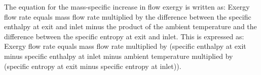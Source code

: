 The equation for the mass-specific increase in flow exergy is written as:  
Exergy flow rate equals mass flow rate multiplied by the difference between the specific enthalpy at exit and inlet minus the product of the ambient temperature and the difference between the specific entropy at exit and inlet.  
This is expressed as:  
Exergy flow rate equals mass flow rate multiplied by (specific enthalpy at exit minus specific enthalpy at inlet minus ambient temperature multiplied by (specific entropy at exit minus specific entropy at inlet)).